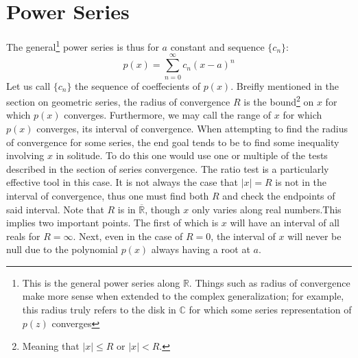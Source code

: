 \documentclass[11pt]{scrreprt}
\newcommand{\abs}[1]{\left| #1 \right|}
\begin{document}
\section*{Power Series}
	The general\footnote{This is the general power series along $\mathbb{R}$. Things such as radius of convergence make more sense when extended
	to the complex generalization; for example, this radius truly refers to the disk in $\mathbb{C}$ for which some series representation of $p(z)$ 
	converges} power series is thus for $a$ constant and sequence $\{c_n\}$:
		\begin{equation}
			p(x) = \sum_{n = 0}^{\infty} c_n (x - a)^n
		\end{equation}
	Let us call $\{c_n\}$ the sequence of coeffecients of $p(x)$. Breifly mentioned in the section on geometric series, 
	the radius of convergence $R$ is the bound\footnote{Meaning that $\abs{x} \leq R$ 
	or $\abs{x} < R$.} on $x$ for which $p(x)$ converges. Furthermore, we may call the range of $x$ for which $p(x)$ converges, its interval
	of convergence. When attempting to find the radius of convergence for some series, the end goal tends to be to find some inequality
	involving $x$ in solitude. To do this one would use one or multiple of the tests described in the section of series convergence. The ratio
	test is a particularly effective tool in this case. It is not always the case that $\abs{x} = R$ is not in the interval of convergence, thus
	one must find both $R$ and check the endpoints of said interval. Note that $R$ is in $\overline{\mathbb{R}}$, though $x$ only varies 
	along real numbers.This implies two important points. The first of which is $x$ will have an interval of all reals for $R=\infty$. Next, 
	even in the case of $R = 0$, the interval of $x$ will never be null due to the polynomial $p(x)$ always having a root at $a$.
\end{document}
